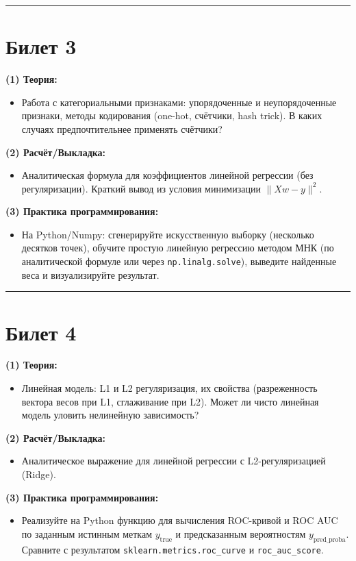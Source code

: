 \documentclass[a4paper,12pt]{article}
\begin{document}
\noindent\rule{\textwidth}{0.4pt}
\newpage

\section*{Билет 3}
\textbf{(1) Теория:}
\begin{itemize}
  \item Работа с категориальными признаками: упорядоченные и неупорядоченные признаки, методы кодирования (one-hot, счётчики, hash trick). В каких случаях предпочтительнее применять счётчики?
\end{itemize}

\textbf{(2) Расчёт/Выкладка:}
\begin{itemize}
  \item Аналитическая формула для коэффициентов линейной регрессии (без регуляризации). Краткий вывод из условия минимизации $\|Xw - y\|^2$.
\end{itemize}

\textbf{(3) Практика программирования:}
\begin{itemize}
  \item На Python/Numpy: сгенерируйте искусственную выборку (несколько десятков точек), обучите простую линейную регрессию методом МНК (по аналитической формуле или через \texttt{np.linalg.solve}), выведите найденные веса и визуализируйте результат.
\end{itemize}

\noindent\rule{\textwidth}{0.4pt}
\newpage

\section*{Билет 4}
\textbf{(1) Теория:}
\begin{itemize}
  \item Линейная модель: L1 и L2 регуляризация, их свойства (разреженность вектора весов при L1, сглаживание при L2). Может ли чисто линейная модель уловить нелинейную зависимость?
\end{itemize}

\textbf{(2) Расчёт/Выкладка:}
\begin{itemize}
  \item Аналитическое выражение для линейной регрессии с L2-регуляризацией (Ridge).
\end{itemize}

\textbf{(3) Практика программирования:}
\begin{itemize}
  \item Реализуйте на Python функцию для вычисления ROC-кривой и ROC AUC по заданным истинным меткам $y_{\text{true}}$ и предсказанным вероятностям $y_{\text{pred\_proba}}$. Сравните с результатом \texttt{sklearn.metrics.roc\_curve} и \texttt{roc\_auc\_score}.
\end{itemize}
\end{document}
